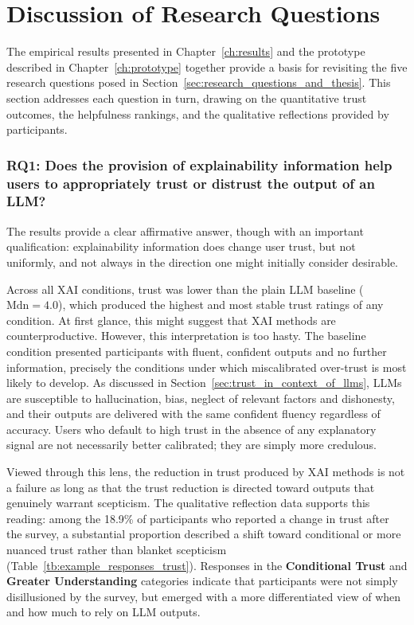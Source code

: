 \section{Discussion of Research Questions}

The empirical results presented in Chapter~\ref{ch:results} and the prototype described in Chapter~\ref{ch:prototype} together provide a basis for revisiting the five research questions posed in Section~\ref{sec:research_questions_and_thesis}. This section addresses each question in turn, drawing on the quantitative trust outcomes, the helpfulness rankings, and the qualitative reflections provided by participants.

\subsubsection*{RQ1: Does the provision of explainability information help users to appropriately trust or distrust the output of an LLM?}

The results provide a clear affirmative answer, though with an important qualification: explainability information does change user trust, but not uniformly, and not always in the direction one might initially consider desirable.

Across all XAI conditions, trust was lower than the plain LLM baseline ($\text{Mdn} = 4.0$), which produced the highest and most stable trust ratings of any condition. At first glance, this might suggest that XAI methods are counterproductive. However, this interpretation is too hasty. The baseline condition presented participants with fluent, confident outputs and no further information, precisely the conditions under which miscalibrated over-trust is most likely to develop. As discussed in Section~\ref{sec:trust_in_context_of_llms}, LLMs are susceptible to hallucination, bias, neglect of relevant factors and dishonesty, and their outputs are delivered with the same confident fluency regardless of accuracy. Users who default to high trust in the absence of any explanatory signal are not necessarily better calibrated; they are simply more credulous.

Viewed through this lens, the reduction in trust produced by XAI methods is not a failure as long as that the trust reduction is directed toward outputs that genuinely warrant scepticism. The qualitative reflection data supports this reading: among the 18.9\% of participants who reported a change in trust after the survey, a substantial proportion described a shift toward conditional or more nuanced trust rather than blanket scepticism (Table~\ref{tb:example_responses_trust}). Responses in the \textbf{Conditional Trust} and \textbf{Greater Understanding} categories indicate that participants were not simply disillusioned by the survey, but emerged with a more differentiated view of when and how much to rely on LLM outputs.

